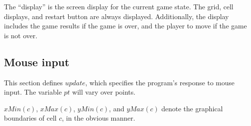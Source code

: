 \documentclass{../src/led_doc}
\begin{document}
\begin{ledCmnt}
The ``display'' is the screen display for the current game state. The grid, cell
displays, and restart button are always displayed. Additionally, the display includes
the game results if the game is over, and the player to move if the game is not over.
\end{ledCmnt}

\begin{ledDef}
\end{ledDef}

\begin{ledCmnt}
\section{Mouse input}

This section defines $update$, which specifies the program's response to mouse
input. The variable $pt$ will vary over points.

$xMin(c)$, $xMax(c)$, $yMin(c)$, and $yMax(c)$ denote the graphical boundaries of
cell $c$, in the obvious manner.
\end{ledCmnt}

\begin{ledDef}
\end{ledDef}

\begin{ledDef}
\end{ledDef}

\begin{ledDef}
\end{ledDef}

\begin{ledDef}
\end{ledDef}
\end{document}

